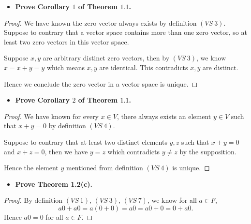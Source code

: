 \begin{Exercise}\label{ex:1.2.9}
	\begin{itemize}
		\item \textbf{Prove Corollary $1$ of Theorem $1.1$.}
	\end{itemize}
	\begin{proof}
		We have known the zero vector always exists by definition $(VS\ 3)$. Suppose to contrary that a vector space contains more than one zero vector, so at least two zero vectors in this vector space. 
		
		Suppose $x,y$ are arbitrary distinct zero vectors, then by $(VS\ 3)$, we know $x = x+y =y$ which means $x,y$ are identical. This contradicts $x,y$ are distinct.
		
		Hence we conclude the zero vector in a vector space is unique.
	\end{proof}
	
	\begin{itemize}
		\item \textbf{Prove Corollary $2$ of Theorem $1.1$.}
	\end{itemize}
	\begin{proof}
		We have known for every $x\in V$, there always exists an element $y\in V$ such that $x+y=0$ by definition $(VS\ 4)$. 
		
		Suppose to contrary that at least two distinct elements $y,z$ such that $x+y=0$ and $x+z=0$, then we have $y=z$ which contradicts $y\neq z$ by the supposition.
		
		Hence the element $y$ mentioned from definition $(VS\ 4)$ is unique.
	\end{proof}
	
	\begin{itemize}
		\item \textbf{Prove Theorem 1.2(c).}
	\end{itemize}
	\begin{proof}
		By definition $(VS\ 1)$, $(VS\ 3)$, $(VS\ 7)$, we know for all $a\in F$,
		$$
		a0 + a0 = a(0+0) = a0 = a0+0 = 0+a0.
		$$
		Hence $a0 = 0$ for all $a\in F$.
	\end{proof}
	
\end{Exercise}
